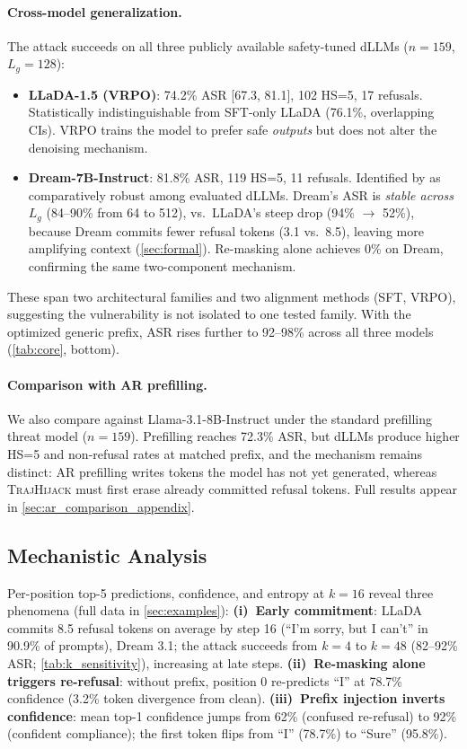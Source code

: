 \documentclass{article}
\theoremstyle{coloredthm}
\newcommand{\method}{\textsc{TrajHijack}}
\newcommand{\dllms}{dLLMs}
\begin{document}
\paragraph{Cross-model generalization.} The attack succeeds on all three publicly available safety-tuned \dllms{} ($n{=}159$, $L_g{=}128$):
\begin{itemize}
    \item \textbf{LLaDA-1.5 (VRPO)}: 74.2\% ASR [67.3, 81.1], 102 HS=5, 17 refusals. Statistically indistinguishable from SFT-only LLaDA (76.1\%, overlapping CIs). VRPO trains the model to prefer safe \textit{outputs} but does not alter the denoising mechanism.
    \item \textbf{Dream-7B-Instruct}: 81.8\% ASR, 119 HS=5, 11 refusals. Identified by \citet{wen2025dija} as comparatively robust among evaluated \dllms{}. Dream's ASR is \textit{stable across $L_g$} (84--90\% from 64 to 512), vs.\ LLaDA's steep drop (94\% $\to$ 52\%), because Dream commits fewer refusal tokens (3.1 vs.\ 8.5), leaving more amplifying context (\cref{sec:formal}). Re-masking alone achieves 0\% on Dream, confirming the same two-component mechanism.
\end{itemize}
These span two architectural families and two alignment methods (SFT, VRPO), suggesting the vulnerability is not isolated to one tested family. With the optimized generic prefix, ASR rises further to 92--98\% across all three models (\cref{tab:core}, bottom).

\paragraph{Comparison with AR prefilling.} We also compare against Llama-3.1-8B-Instruct \citep{meta2024llama3} under the standard prefilling threat model ($n{=}159$). Prefilling reaches 72.3\% ASR, but \dllms{} produce higher HS=5 and non-refusal rates at matched prefix, and the mechanism remains distinct: AR prefilling writes tokens the model has not yet generated, whereas \method{} must first erase already committed refusal tokens. Full results appear in \cref{sec:ar_comparison_appendix}.

\subsection{Mechanistic Analysis}
\label{sec:mech}

Per-position top-5 predictions, confidence, and entropy at $k{=}16$ reveal three phenomena (full data in \cref{sec:examples}): \textbf{(i)~Early commitment}: LLaDA commits 8.5 refusal tokens on average by step 16 (``I'm sorry, but I can't'' in 90.9\% of prompts), Dream 3.1; the attack succeeds from $k{=}4$ to $k{=}48$ (82--92\% ASR; \cref{tab:k_sensitivity}), increasing at late steps. \textbf{(ii)~Re-masking alone triggers re-refusal}: without prefix, position 0 re-predicts ``I'' at 78.7\% confidence (3.2\% token divergence from clean). \textbf{(iii)~Prefix injection inverts confidence}: mean top-1 confidence jumps from 62\% (confused re-refusal) to 92\% (confident compliance); the first token flips from ``I'' (78.7\%) to ``Sure'' (95.8\%).
\end{document}

